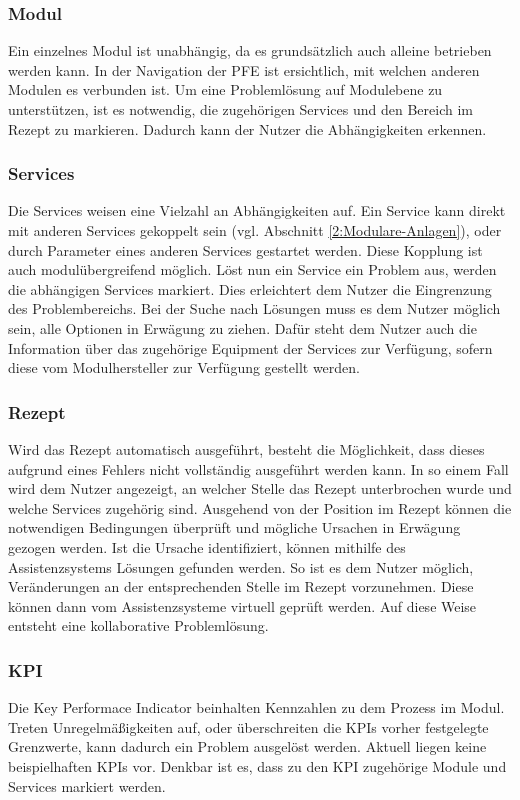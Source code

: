 \subsubsection*{Modul}
Ein einzelnes Modul ist unabhängig, da es grundsätzlich auch alleine betrieben werden kann. In der Navigation der PFE ist ersichtlich, mit welchen anderen Modulen es verbunden ist. Um eine Problemlösung auf Modulebene zu unterstützen, ist es notwendig, die zugehörigen Services und den Bereich im Rezept zu markieren. Dadurch kann der Nutzer die Abhängigkeiten erkennen. 

\subsubsection*{Services}
Die Services weisen eine Vielzahl an Abhängigkeiten auf.  Ein Service kann direkt mit anderen Services gekoppelt sein (vgl. Abschnitt \ref{2:Modulare-Anlagen}), oder durch Parameter eines anderen Services gestartet werden. Diese Kopplung ist auch modulübergreifend möglich. Löst nun ein Service ein Problem aus, werden die abhängigen Services markiert. Dies erleichtert dem Nutzer die Eingrenzung des Problembereichs. Bei der Suche nach Lösungen muss es dem Nutzer möglich sein, alle Optionen in Erwägung zu ziehen. Dafür steht dem Nutzer auch die Information über das zugehörige Equipment der Services zur Verfügung, sofern diese vom Modulhersteller zur Verfügung gestellt werden.

\subsubsection*{Rezept}
Wird das Rezept automatisch ausgeführt, besteht die Möglichkeit, dass dieses aufgrund eines Fehlers nicht vollständig ausgeführt werden kann. In so einem Fall wird dem Nutzer angezeigt, an welcher Stelle das Rezept unterbrochen wurde und welche Services zugehörig  sind. Ausgehend von der Position im Rezept können die notwendigen Bedingungen überprüft und mögliche Ursachen in Erwägung gezogen werden. Ist die Ursache identifiziert, können mithilfe des Assistenzsystems Lösungen gefunden werden. So ist es dem Nutzer möglich, Veränderungen an der entsprechenden Stelle im Rezept vorzunehmen. Diese können dann vom Assistenzsysteme virtuell geprüft werden. Auf diese Weise entsteht eine kollaborative Problemlösung.  

\subsubsection*{KPI}
Die Key Performace Indicator beinhalten Kennzahlen zu dem Prozess im Modul. Treten Unregelmäßigkeiten auf, oder überschreiten die KPIs vorher festgelegte Grenzwerte, kann dadurch ein Problem ausgelöst werden. Aktuell liegen keine beispielhaften KPIs vor. Denkbar ist es, dass zu den KPI zugehörige Module und Services markiert werden.

